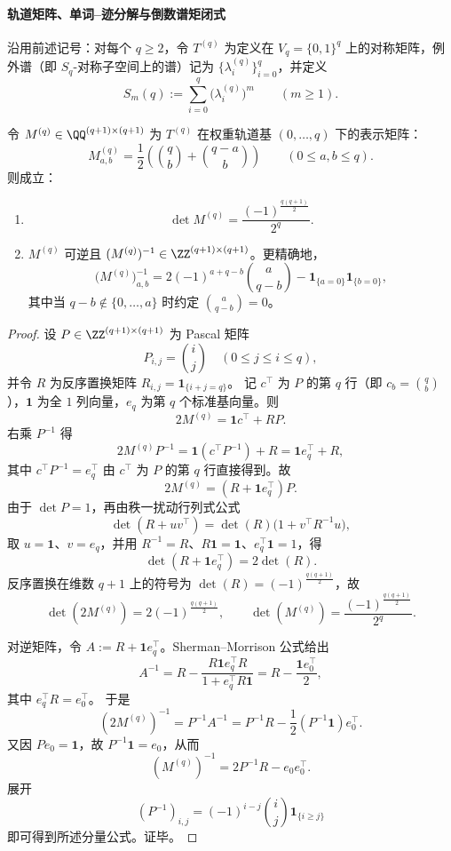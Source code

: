 \paragraph{轨道矩阵、单词--迹分解与倒数谱矩闭式}
沿用前述记号：对每个 \(q\ge 2\)，令 \(T^{(q)}\) 为定义在 \(V_q=\{0,1\}^q\) 上的对称矩阵，例外谱（即 \(S_q\)-对称子空间上的谱）记为 \(\{\lambda_i^{(q)}\}_{i=0}^{q}\)，并定义
\[
S_m(q):=\sum_{i=0}^{q}\bigl(\lambda_i^{(q)}\bigr)^m\qquad(m\ge 1).
\]

\begin{theorem}[例外谱轨道矩阵的行列式闭式与整逆性]\label{thm:xi-replica-softcore-orbit-matrix-determinant-integral-inverse}
令 \(M^{(q)}\in\QQ^{(q+1)\times(q+1)}\) 为 \(T^{(q)}\) 在权重轨道基 \((0,\dots,q)\) 下的表示矩阵：
\[
M^{(q)}_{a,b}=\frac12\!\left(\binom{q}{b}+\binom{q-a}{b}\right)\qquad(0\le a,b\le q).
\]
则成立：
\begin{enumerate}
  \item \[
  \det M^{(q)}=\frac{(-1)^{\frac{q(q+1)}2}}{2^q}.
  \]
  \item \(M^{(q)}\) 可逆且 \((M^{(q)})^{-1}\in\ZZ^{(q+1)\times(q+1)}\)。更精确地，
  \[
  \bigl(M^{(q)}\bigr)^{-1}_{a,b}
  =2(-1)^{a+q-b}\binom{a}{q-b}
  -\mathbf{1}_{\{a=0\}}\mathbf{1}_{\{b=0\}},
  \]
  其中当 \(q-b\notin\{0,\dots,a\}\) 时约定 \(\binom{a}{q-b}=0\)。
\end{enumerate}
\end{theorem}
\begin{proof}
设 \(P\in\ZZ^{(q+1)\times(q+1)}\) 为 Pascal 矩阵
\[
P_{i,j}=\binom{i}{j}\quad(0\le j\le i\le q),
\]
并令 \(R\) 为反序置换矩阵 \(R_{i,j}=\mathbf{1}_{\{i+j=q\}}\)。
记 \(c^\top\) 为 \(P\) 的第 \(q\) 行（即 \(c_b=\binom{q}{b}\)），\(\mathbf{1}\) 为全 \(1\) 列向量，\(e_q\) 为第 \(q\) 个标准基向量。则
\[
2M^{(q)}=\mathbf{1}c^\top+RP.
\]
右乘 \(P^{-1}\) 得
\[
2M^{(q)}P^{-1}=\mathbf{1}(c^\top P^{-1})+R=\mathbf{1}e_q^\top+R,
\]
其中 \(c^\top P^{-1}=e_q^\top\) 由 \(c^\top\) 为 \(P\) 的第 \(q\) 行直接得到。故
\[
2M^{(q)}=(R+\mathbf{1}e_q^\top)P.
\]
由于 \(\det P=1\)，再由秩一扰动行列式公式
\[
\det(R+uv^\top)=\det(R)\bigl(1+v^\top R^{-1}u\bigr),
\]
取 \(u=\mathbf{1}\)、\(v=e_q\)，并用 \(R^{-1}=R\)、\(R\mathbf{1}=\mathbf{1}\)、\(e_q^\top\mathbf{1}=1\)，得
\[
\det(R+\mathbf{1}e_q^\top)=2\det(R).
\]
反序置换在维数 \(q+1\) 上的符号为 \(\det(R)=(-1)^{\frac{q(q+1)}2}\)，故
\[
\det(2M^{(q)})=2(-1)^{\frac{q(q+1)}2},
\qquad
\det(M^{(q)})=\frac{(-1)^{\frac{q(q+1)}2}}{2^q}.
\]

对逆矩阵，令 \(A:=R+\mathbf{1}e_q^\top\)。Sherman--Morrison 公式给出
\[
A^{-1}
=R-\frac{R\mathbf{1}e_q^\top R}{1+e_q^\top R\mathbf{1}}
=R-\frac{\mathbf{1}e_0^\top}{2},
\]
其中 \(e_q^\top R=e_0^\top\)。
于是
\[
(2M^{(q)})^{-1}=P^{-1}A^{-1}
=P^{-1}R-\frac12(P^{-1}\mathbf{1})e_0^\top.
\]
又因 \(Pe_0=\mathbf{1}\)，故 \(P^{-1}\mathbf{1}=e_0\)，从而
\[
(M^{(q)})^{-1}=2P^{-1}R-e_0e_0^\top.
\]
展开
\[
(P^{-1})_{i,j}=(-1)^{i-j}\binom{i}{j}\mathbf{1}_{\{i\ge j\}}
\]
即可得到所述分量公式。证毕。
\end{proof}


